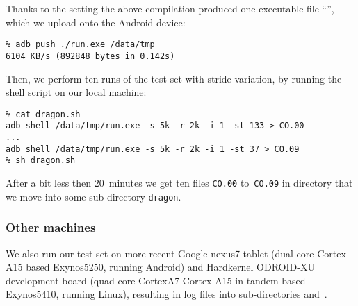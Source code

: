 Thanks to the setting  the above compilation produced one
executable file ``'', which we upload onto the Android device:
\begin{verbatim}
% adb push ./run.exe /data/tmp
6104 KB/s (892848 bytes in 0.142s)
\end{verbatim}
Then, we perform ten runs of the test set with stride variation,
by running the shell script  on our local machine:
\begin{verbatim}
% cat dragon.sh
adb shell /data/tmp/run.exe -s 5k -r 2k -i 1 -st 133 > CO.00
...
adb shell /data/tmp/run.exe -s 5k -r 2k -i 1 -st 37 > CO.09
% sh dragon.sh
\end{verbatim}
After a bit less then $20$~minutes we get ten files
\texttt{CO.00} to~\texttt{CO.09} in directory 
that we move into some sub-directory \texttt{dragon}.

\subsubsection{Other machines}
We also run our test set on more recent
Google nexus7 tablet (dual-core Cortex-A15 based Exynos5250, running Android)
and Hardkernel ODROID-XU development board
(quad-core CortexA7-Cortex-A15 in tandem based Exynos5410, running Linux),
resulting in log files into sub-directories  and~.

\fi
